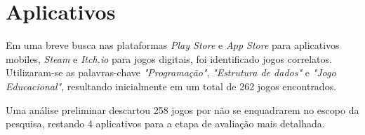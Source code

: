 \section{Aplicativos}

Em uma breve busca nas plataformas \emph{Play Store} e \emph{App Store} para aplicativos mobiles, \emph{Steam} e \emph{Itch.io} para jogos digitais, foi identificado jogos correlatos. Utilizaram-se as palavras-chave \emph{"Programação"}, \emph{"Estrutura de dados"} e \emph{"Jogo Educacional"}, resultando inicialmente em um total de 262 jogos encontrados.

Uma análise preliminar descartou 258 jogos por não se enquadrarem no escopo da pesquisa, restando 4 aplicativos para a etapa de avaliação mais detalhada.







